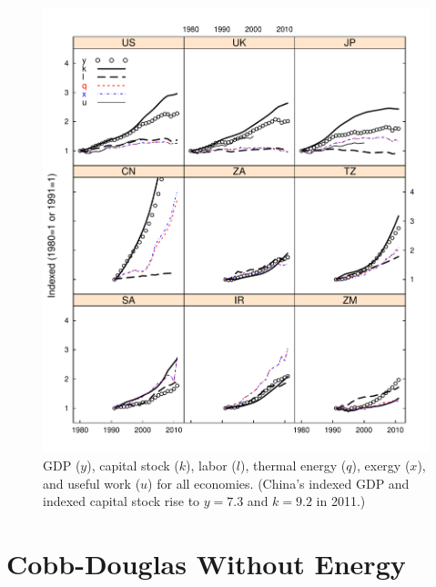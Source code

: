 \documentclass[preprint,authoryear,12pt]{elsarticle}\usepackage{graphicx, color}
\makeatletter
\def\maxwidth{ %
  \ifdim\Gin@nat@width>\linewidth
    \linewidth
  \else
    \Gin@nat@width
  \fi
}
\newenvironment{knitrout}{}{} %
\makeatother
\begin{document}
\begin{knitrout}
\color{fgcolor}\begin{figure}[]

\includegraphics[width=\maxwidth]{figure/Factors_Lattice_Graph} \caption[GDP ($y$), capital stock ($k$), labor ($l$), thermal energy ($q$), exergy ($x$), and useful work ($u$) for all economies]{GDP ($y$), capital stock ($k$), labor ($l$), thermal energy ($q$), exergy ($x$), and useful work ($u$) for all economies. (China's indexed GDP and indexed capital stock rise to $y = 7.3$ and $k = 9.2$ in 2011.)\label{fig:Factors_Lattice_Graph}}
\end{figure}


\end{knitrout}


\section{Cobb-Douglas Without Energy}
\end{document}
